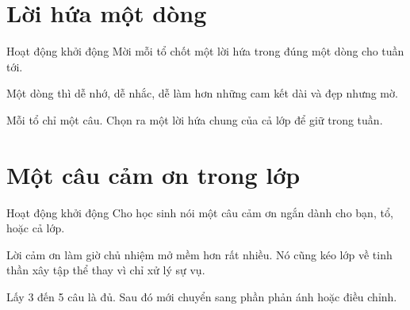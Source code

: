 \section{Lời hứa một dòng}
\begin{khoidongbox}{Hoạt động khởi động}
Mời mỗi tổ chốt một lời hứa trong đúng một dòng cho tuần tới.
\end{khoidongbox}
\begin{visaohieuqua}
Một dòng thì dễ nhớ, dễ nhắc, dễ làm hơn những cam kết dài và đẹp nhưng mờ.
\end{visaohieuqua}
\begin{cachlam5phut}
Mỗi tổ chỉ một câu. Chọn ra một lời hứa chung của cả lớp để giữ trong tuần.
\end{cachlam5phut}
\ngancach

\section{Một câu cảm ơn trong lớp}
\begin{khoidongbox}{Hoạt động khởi động}
Cho học sinh nói một câu cảm ơn ngắn dành cho bạn, tổ, hoặc cả lớp.
\end{khoidongbox}
\begin{visaohieuqua}
Lời cảm ơn làm giờ chủ nhiệm mở mềm hơn rất nhiều. Nó cũng kéo lớp về tinh thần xây tập thể thay vì chỉ xử lý sự vụ.
\end{visaohieuqua}
\begin{cachlam5phut}
Lấy 3 đến 5 câu là đủ. Sau đó mới chuyển sang phần phản ánh hoặc điều chỉnh.
\end{cachlam5phut}